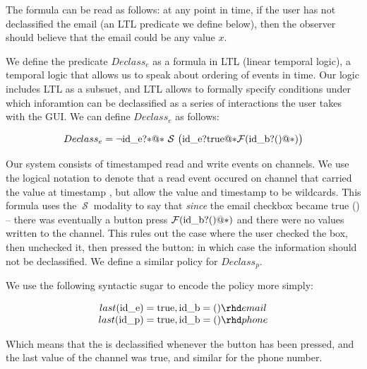 \documentclass[conference]{IEEEtran}
\newcommand{\code}[1]{\text{\lstinline!#1!}}
\theoremstyle{definition}
\newcommand{\tfuture}{\mathcal{F}}
\newcommand{\tsince}{~\mathcal{S}~}
\begin{document}
The formula can be read as follows: at any point in time, if the user
has not declassified the email (an LTL predicate we define below), then
the observer should believe that the email could be any value $x$.

We define the predicate $Declass_e$ as a formula in LTL (linear
temporal logic), a temporal logic that allows us to speak about
ordering of events in time.  Our logic includes LTL as a subsuet, and
LTL allows to formally specify conditions
under which inforamtion can be declassified as a series of interactions
the user takes with the GUI.  We can define $Declass_e$ as follows:

\begin{displaymath}
  \begin{array}{c}
    Declass_e =  \lnot \code{id\_e?*@*} \tsince \big(
    \code{id\_e?true@*} \tfuture (\code{id\_b?()@*}) \big)
  \end{array}
\end{displaymath}  

Our system consists of timestamped read and write events on channels.
We use the logical notation \code{id_e?v@i} to denote that a read
event occured on channel \code{id_e} that carried the value \code{v}
at timestamp \code{i}, but allow the value and timestamp to be
wildcards.  This formula uses the $\tsince$ modality to say that
\emph{since} the email checkbox became true (\code{id\_e?true@*}) --
there was eventually a button press $\tfuture (\code{id\_b?()@*})$ and
there were no values written to the \code{id_e} channel.  This rules
out the case where the user checked the box, then unchecked it, then
pressed the button: in which case the information should not be
declassified. We define a similar policy for $Declass_p$.

We use the following syntactic sugar to encode the policy more simply:

\begin{displaymath}
  \begin{array}{c}
    last(\code{id\_e}) = \code{true} , \code{id_b} = () \rhd email \\
    last(\code{id\_p}) = \code{true} , \code{id_b} = () \rhd phone \\
  \end{array}
\end{displaymath}

Which means that the \code{email} is declassified whenever the button
has been pressed, and the last value of the \code{id_e} channel was
true, and similar for the phone number.
\end{document}
